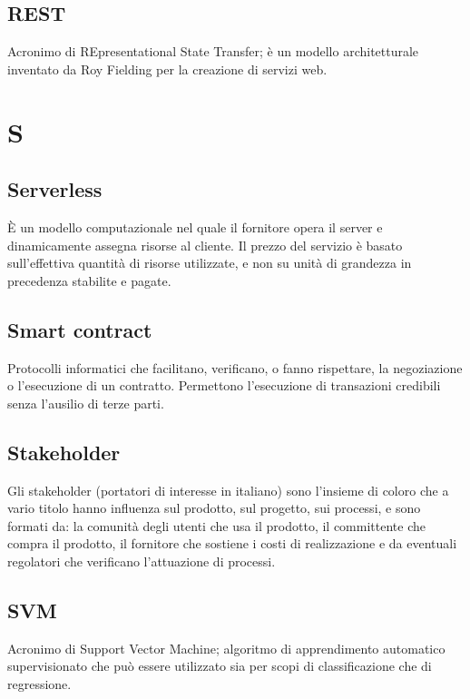 \subsection*{REST}
Acronimo di REpresentational State Transfer; è un modello architetturale inventato da Roy Fielding per la creazione di servizi web.

\clearpage
\section*{S}


\subsection*{Serverless}
È un modello computazionale nel quale il fornitore opera il server e dinamicamente assegna risorse al cliente. Il prezzo del servizio è basato sull'effettiva quantità di risorse utilizzate, e non su unità di grandezza in precedenza stabilite e pagate.

\subsection*{Smart contract}
Protocolli informatici che facilitano, verificano, o fanno rispettare, la negoziazione o l'esecuzione di un contratto. Permettono l'esecuzione di transazioni credibili senza l'ausilio di terze parti.

\subsection*{Stakeholder}
Gli stakeholder (portatori di interesse in italiano) sono l’insieme di coloro che a vario titolo hanno influenza sul prodotto, sul progetto, sui processi, e sono formati da: la comunità degli utenti che usa il prodotto, il committente che compra il prodotto, il fornitore che sostiene i costi di realizzazione e da eventuali regolatori che verificano l’attuazione di processi.

\subsection*{SVM}
Acronimo di Support Vector Machine; algoritmo di apprendimento automatico supervisionato che può essere utilizzato sia per scopi di classificazione che di regressione.

